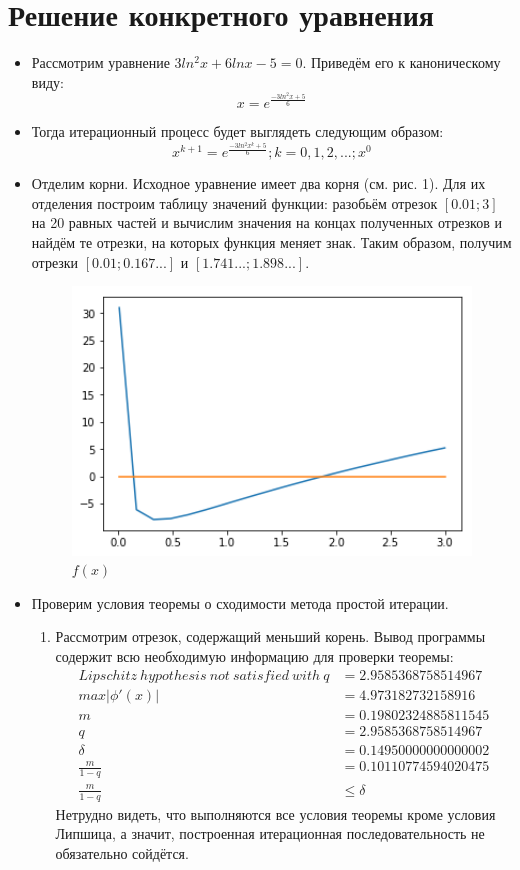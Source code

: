 \documentclass[14pt, a4paper]{article}
\begin{document}
  \section*{Решение конкретного уравнения}
  \begin{itemize}
    \item
    Рассмотрим уравнение $3ln^2x + 6lnx - 5 = 0$. Приведём его к каноническому виду: \begin{equation}x = e^{\frac{-3ln^2x + 5}{6}}\end{equation}
    \item
    Тогда итерационный процесс будет выглядеть следующим образом: \begin{equation}x^{k + 1} = e^{\frac{-3ln^2x^k + 5}{6}}; k = 0, 1, 2, ...; x^0\end{equation}
    \item
    Отделим корни. Исходное уравнение имеет два корня (см. рис. 1). Для их отделения построим таблицу значений функции: разобьём отрезок $[0.01; 3]$ на 20 равных частей и вычислим значения
    на концах полученных отрезков и найдём те отрезки, на которых функция меняет знак. Таким образом, получим отрезки $[0.01; 0.167...]$ и $[1.741...; 1.898...]$.
    \begin{figure}[h!]
    \includegraphics[width=300pt]{f(x).png}
    \caption{$f(x)$}
    \end{figure}
    \item
    Проверим условия теоремы о сходимости метода простой итерации.
    \begin{enumerate}
    \item
    Рассмотрим отрезок, содержащий меньший корень. Вывод программы содержит всю необходимую информацию для проверки теоремы:
\begin{align*}
Lipschitz\ hypothesis\ not\ satisfied\ with\ q &= 2.9585368758514967\\
max|\phi'(x)| &= 4.973182732158916\\
m &= 0.19802324885811545\\
q &= 2.9585368758514967\\
\delta &= 0.14950000000000002\\
\frac{m}{1 - q} &= 0.10110774594020475\\
\frac{m}{1 - q} &\leq \delta
\end{align*}
    Нетрудно видеть, что выполняются все условия теоремы кроме условия Липшица, а значит, построенная итерационная последовательность не обязательно сойдётся.


\end{enumerate}
\end{itemize}
\end{document}
